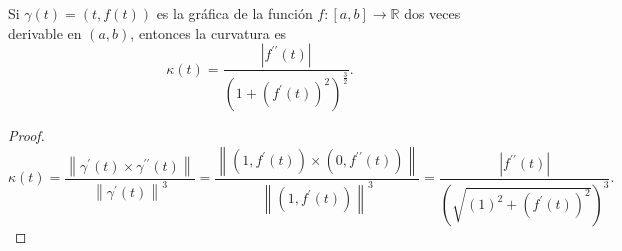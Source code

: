 \begin{frame}
    \begin{theorem}
        Si
        \begin{math}
            \gamma\left(t\right)=
            \left(
            t,
            f\left(t\right)
            \right)
        \end{math}
        es la gráfica de la función
        \begin{math}
            f\colon
            \left[a,b\right]\to
            \mathbb{R}
        \end{math}
        dos veces derivable en
        $\left(a,b\right)$, entonces la curvatura es
        \begin{equation*}
            \kappa\left(t\right)=
            \dfrac{
                \left|
                f^{\prime\prime}
                \left(t\right)
                \right|
            }{
                {\left(
                        1+
                        {\left(f^{\prime}\left(t\right)\right)}^{2}
                        \right)}^{\frac{3}{2}}
            }.
        \end{equation*}
    \end{theorem}

    \begin{proof}
        \begin{equation*}
            \kappa\left(t\right)=
            \dfrac{
                \left\|
                \gamma^{\prime}\left(t\right)\times
                \gamma^{\prime\prime}\left(t\right)
                \right\|
            }{
                {\left\|
                        \gamma^{\prime}\left(t\right)
                        \right\|}^{3}
            }=
            \dfrac{
                \left\|
                \left(
                1,f^{\prime}\left(t\right)
                \right)\times
                \left(
                0,f^{\prime\prime}\left(t\right)
                \right)
                \right\|
            }{
                {\left\|
                        \left(
                        1,f^{\prime}\left(t\right)
                        \right)
                        \right\|}^{3}
            }=
            \dfrac{
                \left|
                f^{\prime\prime}
                \left(t\right)
                \right|
            }{
                {\left(
                        \sqrt{
                            {\left(1\right)}^{2}+
                            {\left(f^{\prime}\left(t\right)\right)}^{2}
                        }
                        \right)}^{3}
            }.
        \end{equation*}
    \end{proof}
\end{frame}
